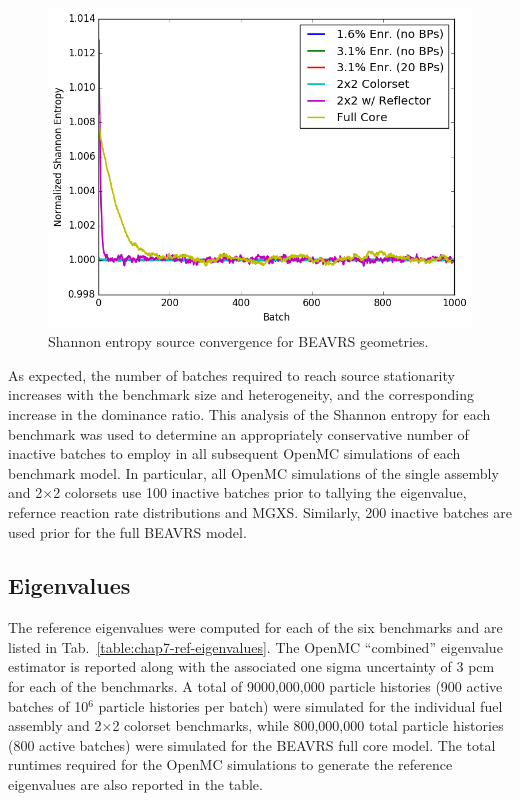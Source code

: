 \begin{figure}[h!]
  \centering
  \includegraphics[width=0.9\linewidth]{figures/benchmarks/entropy/entropy-all}
\caption[Shannon entropy source convergence for BEAVRS geometries]{Shannon entropy source convergence for BEAVRS geometries.}
\label{fig:chap7-entropy}
\end{figure}

As expected, the number of batches required to reach source stationarity increases with the benchmark size and heterogeneity, and the corresponding increase in the dominance ratio. This analysis of the Shannon entropy for each benchmark was used to determine an appropriately conservative number of inactive batches to employ in all subsequent OpenMC simulations of each benchmark model. In particular, all OpenMC simulations of the single assembly and 2$\times$2 colorsets use 100 inactive batches prior to tallying the eigenvalue, refernce reaction rate distributions and \ac{MGXS}. Similarly, 200 inactive batches are used prior for the full \ac{BEAVRS} model.

\subsection{Eigenvalues}
\label{subsec:chap7-eigenvalues}

The reference eigenvalues were computed for each of the six benchmarks and are listed in Tab.~\ref{table:chap7-ref-eigenvalues}. The OpenMC ``combined'' eigenvalue estimator is reported along with the associated one sigma uncertainty of 3 \ac{pcm} for each of the benchmarks. A total of 9000,000,000 particle histories (900 active batches of 10$^6$ particle histories per batch) were simulated for the individual fuel assembly and 2$\times$2 colorset benchmarks, while 800,000,000 total particle histories (800 active batches) were simulated for the \ac{BEAVRS} full core model. The total runtimes required for the OpenMC simulations to generate the reference eigenvalues are also reported in the table. 


